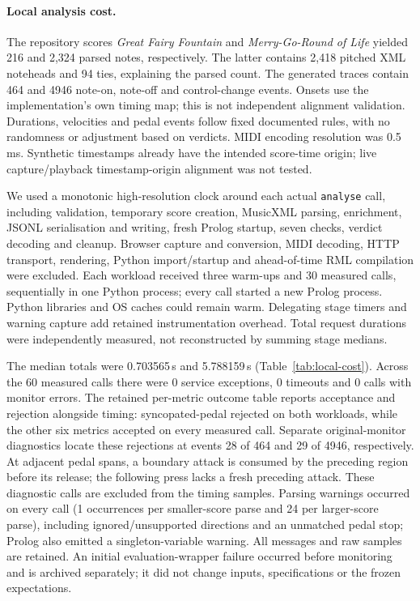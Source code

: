 \paragraph{Local analysis cost.}
The repository scores \emph{Great Fairy Fountain} and
\emph{Merry-Go-Round of Life} yielded 216 and 2,324 parsed notes, respectively.
The latter contains 2,418 pitched XML noteheads and 94 ties, explaining the
parsed count. The generated traces contain 464 and 4946
note-on, note-off and control-change events. Onsets use the implementation's
own timing map; this is not independent alignment validation. Durations,
velocities and pedal events follow fixed documented rules, with no randomness
or adjustment based on verdicts. MIDI encoding resolution was 0.5\,ms.
Synthetic timestamps already have the intended score-time origin; live
capture/playback timestamp-origin alignment was not tested.

We used a monotonic high-resolution clock around each actual
\texttt{analyse} call, including validation, temporary score creation,
MusicXML parsing, enrichment, JSONL serialisation and writing, fresh Prolog
startup, seven checks, verdict decoding and cleanup. Browser capture and
conversion, MIDI decoding, HTTP transport, rendering, Python import/startup
and ahead-of-time RML compilation were excluded. Each workload received
three warm-ups and 30 measured calls, sequentially in one Python process;
every call started a new Prolog process. Python libraries and OS caches could
remain warm. Delegating stage timers and warning capture add retained
instrumentation overhead. Total request durations were independently measured,
not reconstructed by summing stage medians.

\begin{table}[t]
\centering
\resizebox{\linewidth}{!}{}
\caption{Local analysis times in seconds, with linear-interpolation quartiles.
Every measured sample is retained; warm-ups are excluded from the statistics.}
\label{tab:local-cost}
\end{table}

The median totals were 0.703565\,s and 5.788159\,s
(Table~\ref{tab:local-cost}). Across the 60 measured calls there were
0 service exceptions, 0 timeouts and 0 calls with monitor errors.
The retained per-metric outcome table reports acceptance and rejection
alongside timing: syncopated-pedal rejected on both workloads, while the
other six metrics accepted on every measured call.
Separate original-monitor diagnostics locate these rejections at events
28 of 464 and
29 of 4946, respectively.
At adjacent pedal spans, a boundary attack is consumed by the preceding
region before its release; the following press lacks a fresh preceding attack.
These diagnostic calls are excluded from the timing samples.
Parsing warnings occurred on every call (1 occurrences per smaller-score
parse and 24 per larger-score parse), including ignored/unsupported
directions and an unmatched pedal stop; Prolog also emitted a singleton-variable
warning. All messages and raw samples are retained. An initial evaluation-wrapper
failure occurred before monitoring and is archived separately; it did not change
inputs, specifications or the frozen expectations.


